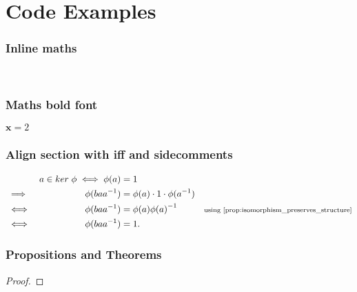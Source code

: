 \documentclass[MathsNotesBase.tex]{subfiles}
\date{\vspace{-6ex}}
\begin{document}
	\chapter*{Code Examples}
	
	\subsection{Inline maths}
	${}$ %
	${\bm{}}$ %
	
	\subsection{Maths bold font}
	$\bm{x} = 2$
	
	\subsection{Align section with iff and sidecomments}
	\[\begin{aligned}
		&& a \in ker \; \phi \iff \phi(a) &= 1 \\
		&\implies & \phi(ba\inv{a}) &= \phi(a) \cdot 1 \cdot \phi(\inv{a}) \\
		&\iff & \phi(ba\inv{a}) &= \phi(a)\inv{\phi(a)} &\sidecomment{using \autoref{prop:isomorphism_preserves_structure}} \\
		&\iff & \phi(ba\inv{a}) &= 1.
	\end{aligned}\]

	\subsection{Propositions and Theorems}
	\begin{proof}
	\end{proof}
	
\end{document}
